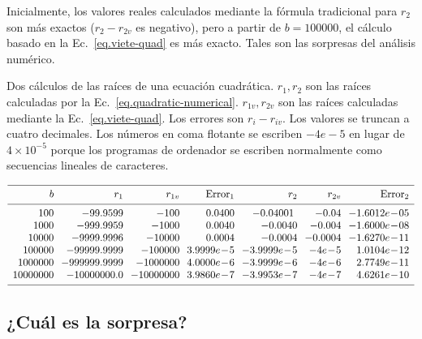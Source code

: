 Inicialmente, los valores reales calculados mediante la fórmula tradicional para $r_2$ son más exactos ($r_2-r_{2v}$ es negativo), pero a partir de $b=100000$, el cálculo basado en la Ec.~\ref{eq.viete-quad} es más exacto. Tales son las sorpresas del análisis numérico.

\begin{table}[bht]
\caption[Dos cálculos de las raíces de una ecuación cuadrática]{Dos cálculos de las raíces de una ecuación cuadrática. $r_1,r_2$ son las raíces calculadas por la Ec.~\ref{eq.quadratic-numerical}. $r_{1v},r_{2v}$ son las raíces calculadas mediante la Ec.~\ref{eq.viete-quad}. Los errores son $r_{i}-r_{iv}$. Los valores se truncan a cuatro decimales.
Los números en coma flotante se escriben $-4e-5$ en lugar de $4\times 10^{-5}$ porque los programas de ordenador se escriben normalmente como secuencias lineales de caracteres.} \label{t.quadratic}
\[
\begin{array}{r@{\hspace{2.5mm}}r@{\hspace{2.5mm}}r@{\hspace{2.5mm}}r@{\hspace{2.5mm}}r@{\hspace{2.5mm}}r@{\hspace{2.5mm}}r}
\hline
\noalign{\smallskip}
b & r_1 & r_{1v} & \mathrm{Error}_1 & r_2 & r_{2v} & \mathrm{Error}_2\\
\noalign{\smallskip}\hline\noalign{\smallskip}
100  &  -99.9599  &  -100  &  0.0400  &  -0.04001\  &  -0.04  &  -1.6012e\!-\!05\\
1000  &  -999.9959  &  -1000  &  0.0040  &  -0.0040  &  -0.004  &  -1.6000e\!-\!08\\
10000  &  -9999.9996  &  -10000  &  0.0004  &  -0.0004  &  -0.0004  &  -1.6270e\!-\!11\\
100000  &  -99999.9999  &  -100000  &  3.9999e\!-\!5  &  -3.9999e\!-\!5  &  -4e\!-\!5  &  1.0104e\!-\!12\\
1000000  &  -999999.9999  &  -1000000  &  4.0000e\!-\!6  &  -3.9999e\!-\!6  &  -4e\!-\!6  &  2.7749e\!-\!11\\
10000000  &  -10000000.0  &  -10000000  &  3.9860e\!-\!7  &  -3.9953e\!-\!7  &  -4e\!-\!7  &  4.6261e\!-\!10\\
 \noalign{\smallskip}
 \hline
\end{array}
\]
\end{table}

\subsection*{¿Cuál es la sorpresa?}

